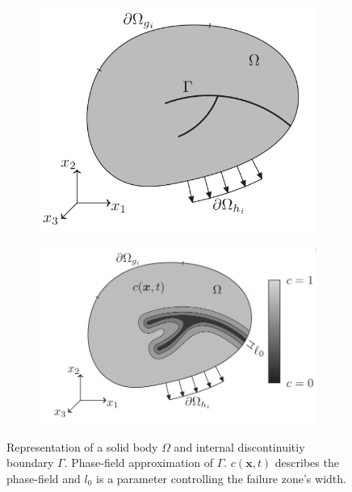 \begin{figure}[ht!]
    \centering
    \begin{subfigure}[t]{0.4\textwidth}
        \centering
        \includegraphics[scale=0.3]{data/Body_1}
        \caption{}\label{fig:body_1}
    \end{subfigure}
    \begin{subfigure}[t]{0.5\textwidth}
        \centering
        \includegraphics[scale=0.3]{data/Body_2}
        \caption{}\label{fig:body_2}
    \end{subfigure}
    \caption{ Representation of a solid body $\Omega$ and internal discontinuitiy boundary $\Gamma$.  Phase-field approximation of $\Gamma$. $c\left(\mathbf{x},t\right)$ describes the phase-field and $l_{0}$ is a parameter controlling the failure zone's width. \cite{01_PF_dyn_brittle}} \label{fig:bodies}
\end{figure}


